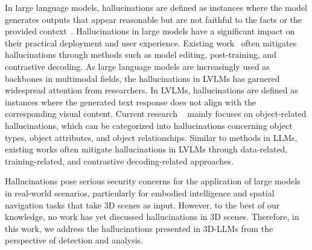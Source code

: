 In large language models, hallucinations are defined as instances where the model generates outputs that appear reasonable but are not faithful to the facts or the provided context~\cite{filippova-2020-controlled}. Hallucinations in large models have a significant impact on their practical deployment and user experience. Existing work~\cite{leng2024mitigating, liu2023mitigating, yu2024hallucidoctor, zhai2023halle} often mitigates hallucinations through methods such as model editing, post-training, and contrastive decoding. As large language models are increasingly used as backbones in multimodal fields, the hallucinations in LVLMs has garnered widespread attention from researchers. In LVLMs, hallucinations are defined as instances where the generated text response does not align with the corresponding visual content. Current research ~\cite{rohrbach2018object, li2023evaluating, hu2023ciem} mainly focuses on object-related hallucinations, which can be categorized into hallucinations concerning object types, object attributes, and object relationships. Similar to methods in LLMs, existing works often mitigate hallucinations in LVLMs through data-related, training-related, and contrastive decoding-related approaches.

Hallucinations pose serious security concerns for the application of large models in real-world scenarios, particularly for embodied intelligence and spatial navigation tasks that take 3D scenes as input. However, to the best of our knowledge, no work has yet discussed hallucinations in 3D scenes. Therefore, in this work, we address the hallucinations presented in 3D-LLMs from the perspective of detection and analysis.